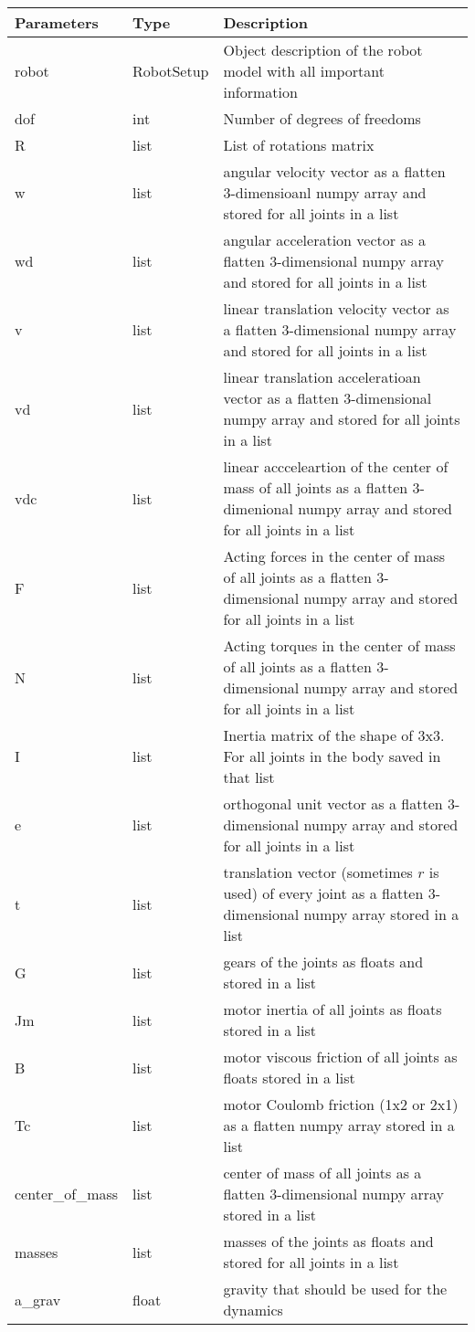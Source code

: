 \documentclass[
	ngerman,
	accentcolor=9c,%
	type=intern,
	marginpar=false
	]{tudapub}
\begin{document}
\vspace{0.5cm}
\begin{tabular}{|p{}| p{}| p{}|}
\hline
\textbf{Parameters} & \textbf{Type} & \textbf{Description} \\
\hline
robot & RobotSetup & Object description of the robot model with all important information \\
\hline
dof & int & Number of degrees of freedoms \\
\hline
R & list & List of rotations matrix  \\
\hline
w & list & angular velocity vector as a flatten 3-dimensioanl numpy array and stored for all joints in a list\\
\hline
wd & list & angular acceleration vector as a flatten 3-dimensional numpy array and stored for all joints in a list \\
\hline
v & list & linear translation velocity vector as a flatten 3-dimensional numpy array and stored for all joints in a list \\
\hline
vd & list & linear translation acceleratioan vector as a flatten 3-dimensional numpy array and stored for all joints in a list \\
\hline
vdc & list & linear accceleartion of the center of mass of all joints as a flatten 3-dimenional numpy array and stored for all joints in a list  \\
\hline
F & list & Acting forces in the center of mass of all joints as a flatten 3-dimensional numpy array and stored for all joints in a list  \\
\hline
N & list &  Acting torques in the center of mass of all joints as a flatten 3-dimensional numpy array and stored for all joints in a list \\
\hline
I & list & Inertia matrix of the shape of 3x3. For all joints in the body saved in that list\\
\hline
e & list & orthogonal unit vector as a flatten 3-dimensional numpy array and stored for all joints in a list \\
\hline
t & list & translation vector (sometimes $r$ is used) of every joint as a flatten 3-dimensional numpy array stored in a list  \\
\hline
G & list & gears of the joints as floats and stored in a list\\
\hline
Jm & list & motor inertia of all joints as floats stored in a list\\
\hline
B & list & motor viscous friction  of all joints as floats stored in a list\\
\hline
Tc & list & motor Coulomb friction (1x2 or 2x1) as a flatten numpy array stored in a list\\
\hline
center\_of\_mass & list & center of mass of all joints as a flatten 3-dimensional numpy array stored in a list  \\
\hline
masses & list & masses of the joints as floats and stored for all joints in a list  \\
\hline
a\_grav & float & gravity that should be used for the dynamics  \\
\hline
\end{tabular}
\end{document}
